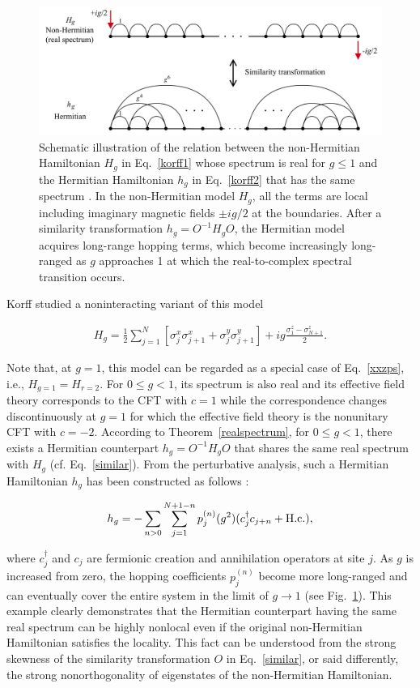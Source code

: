 \documentclass{tADP2e}
\theoremstyle{plain}
\newcommand{\eqn}[1]{
\begin{eqnarray}
	#1
\end{eqnarray}
}
\theoremstyle{plain}
\theoremstyle{definition}
\begin{document}
{\begin{figure}
\begin{center}
\includegraphics[width=12cm]{./Figures/fig_2_korff.pdf}
\end{center}
\caption{Schematic  illustration of the relation between the non-Hermitian Hamiltonian $H_g$ in Eq.~\eqref{korff1} whose spectrum is real for $g\leq1$ and the Hermitian Hamiltonian $h_g$  in Eq.~\eqref{korff2} that has the same spectrum \cite{CK08}. In the non-Hermitian model $H_g$, all the terms are local including imaginary magnetic fields $\pm ig/2$ at the boundaries. After a similarity transformation $h_g=O^{-1}H_gO$, the Hermitian model acquires long-range hopping terms, which become increasingly long-ranged as $g$ approaches 1 at which the real-to-complex spectral transition occurs.   
}
\label{fig:2korff}
\end{figure}

Korff studied a noninteracting variant of this model \cite{CK08}
\eqn{\label{korff1}
H_g=\frac{1}{2}\sum_{j=1}^{N}\left[\sigma_j^x\sigma_{j+1}^x+\sigma_j^y\sigma_{j+1}^y\right]+ig\frac{\sigma_1^z-\sigma_{N+1}^z}{2}.
}
Note that, at $g=1$, this model can be regarded as a special case of Eq.~\eqref{xxzps}, i.e., $H_{g=1}=H_{r=2}$. For $0\leq g<1$, its spectrum is also real and its effective field theory corresponds to the CFT with $c=1$ while the correspondence changes discontinuously at $g=1$ for which the effective field theory is the nonunitary CFT  with $c=-2$. According to Theorem~\ref{realspectrum},  for $0\leq g<1$, there exists a Hermitian counterpart $h_g=O^{-1}H_gO$ that shares the same real spectrum with $H_g$ (cf. Eq.~\eqref{similar}). From the perturbative analysis, such a Hermitian Hamiltonian $h_g$ has been constructed as follows \cite{CK08}:
\eqn{\label{korff2}
h_{g}=-\sum_{n>0}\sum_{j=1}^{N+1-n}p_{j}^{(n)}(g^2)(c^{\dagger}_{j}c_{j+n}+{\rm H.c.}),
}
where $c_{j}^\dagger$ and $c_{j}$ are fermionic creation and annihilation operators at site $j$. As $g$ is increased from zero, the hopping coefficients $p_{j}^{(n)}$ become more long-ranged and can eventually cover the entire system in the limit of $g\to 1$ (see Fig.~\ref{fig:2korff}). This example clearly demonstrates that the Hermitian counterpart having the same real spectrum can be highly nonlocal even if the original non-Hermitian Hamiltonian satisfies the locality. This fact can be understood from the strong skewness of the similarity transformation $O$ in Eq.~\eqref{similar}, or said differently, the strong nonorthogonality of eigenstates of the non-Hermitian Hamiltonian. 


}
\end{document}
